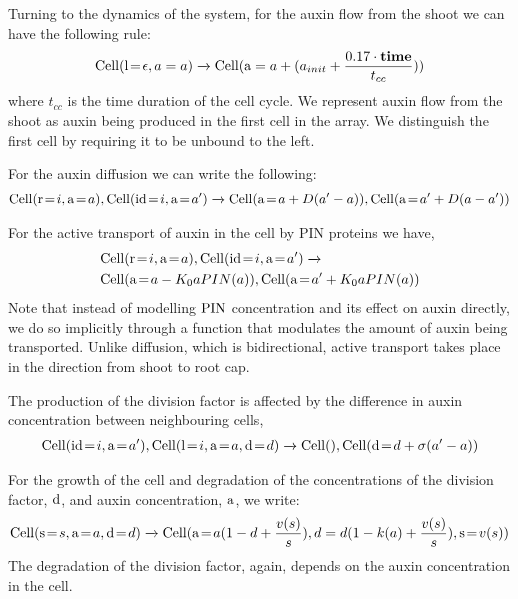 Turning to the dynamics of the system, for the auxin flow from the shoot we can
have the following rule:
\begin{align*}
\mathrm{Cell}(\mathrm{l} \!=\! \epsilon, a=a) \xrightarrow{} \mathrm{Cell}(\mathrm{a}=a + (a_{init} + \frac{0.17 \cdot \mathbf{time}}{t_{cc}}))
\end{align*}
where $t_{cc}$ is the time duration of the cell cycle. We represent auxin flow
from the shoot as auxin being produced in the first cell in the array. We
distinguish the first cell by requiring it to be unbound to the left. 

For the auxin diffusion we can write the following:
\begin{align*}
\mr{Cell}(\ar{r}{i}, \ar{a}{a}), \mr{Cell}(\ar{id}{i}, \ar{a}{a'})
  \xrightarrow{} \mr{Cell}(\ar{a}{a + D(a'-a)}), \mr{Cell}(\ar{a}{a' + D(a - a')})
\end{align*}

For the active transport of auxin in the cell by PIN proteins we have,
\begin{align*}
& \mr{Cell}(\ar{r}{i}, \ar{a}{a}), \mr{Cell}(\ar{id}{i}, \ar{a}{a'})
                 \xrightarrow{} \\
  &\mr{Cell}(\ar{a}{a - K_0 a PIN(a)}), \mr{Cell}(\ar{a}{a' + K_0
  a PIN(a)})
\end{align*}
Note that instead of modelling $\mathrm{PIN}$ concentration and its effect on auxin
directly, we do so implicitly through a function that modulates the
amount of auxin being transported. Unlike diffusion, which is bidirectional,
active transport takes place in the direction from shoot to root cap.

The production of the division factor is affected by the difference in auxin
concentration between neighbouring cells,
\begin{align*}
\mr{Cell}(\ar{id}{i}, \ar{a}{a'}), \mr{Cell}(\ar{l}{i}, \ar{a}{a}, \ar{d}{d})
  \xrightarrow{} \mr{Cell}(), \mr{Cell}(\ar{d}{d+\sigma(a'-a)})
\end{align*}

For the growth of the cell and degradation of the concentrations of the division
factor, $\mathrm{d}$, and auxin concentration, $\mathrm{a}$, we write:
\begin{align*}
\mr{Cell}(\ar{s}{s}, \ar{a}{a}, \ar{d}{d}) \xrightarrow{} \mr{Cell}(\ar{a}{a (1 - d +
  \frac{v(s)}{s})}, d=d (1 - k(a) + \frac{v(s)}{s}), \ar{s}{v(s)})
\end{align*}
The degradation of the division factor, again, depends on the auxin
concentration in the cell.

